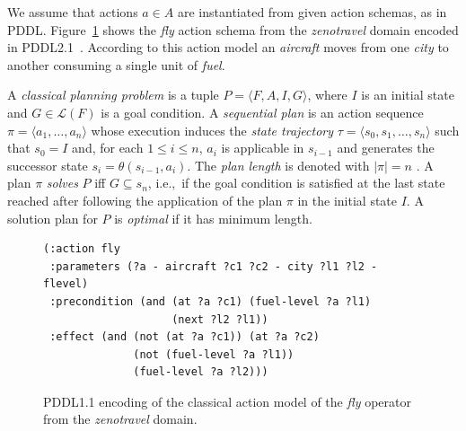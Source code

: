 \documentclass[letterpaper]{article} %
\newcommand{\tup}[1]{{\langle #1 \rangle}}
\begin{document}
We assume that actions $a\in A$ are instantiated from given action schemas, as in PDDL. Figure~\ref{fig:flyc} shows the {\em fly} action schema from the {\em zenotravel} domain encoded in PDDL2.1~\cite{fox2003pddl2}. According to this action model an {\em aircraft} moves from one {\em city} to another consuming a single unit of {\em fuel}.

A {\em classical planning problem} is a tuple $P=\tup{F,A,I,G}$, where $I$ is an initial state and $G\in\mathcal{L}(F)$ is a goal condition. A {\em sequential plan} is an action sequence $\pi=\tup{a_1, \ldots, a_n}$ whose execution induces the {\em state trajectory} $\tau=\tup{s_0, s_1, \ldots, s_n}$ such that $s_0=I$ and, for each {\small $1\leq i\leq n$}, $a_i$ is applicable in $s_{i-1}$ and generates the successor state $s_i=\theta(s_{i-1},a_i)$. The {\em plan length} is denoted with $|\pi|=n$ . A plan $\pi$ {\em solves} $P$ iff $G\subseteq s_n$, i.e.,~if the goal condition is satisfied at the last state reached after following the application of the plan $\pi$ in the initial state $I$. A solution plan for $P$ is {\em optimal} if it has minimum length.

\begin{figure}
	\begin{scriptsize}
		\begin{verbatim}
(:action fly
 :parameters (?a - aircraft ?c1 ?c2 - city ?l1 ?l2 - flevel)
 :precondition (and (at ?a ?c1) (fuel-level ?a ?l1)
                    (next ?l2 ?l1))
 :effect (and (not (at ?a ?c1)) (at ?a ?c2)
              (not (fuel-level ?a ?l1))
              (fuel-level ?a ?l2)))
		\end{verbatim}
	\end{scriptsize}
	\caption{PDDL1.1 encoding of the classical action model of the {\em fly} operator from the {\em zenotravel} domain.}
	\label{fig:flyc}
\end{figure}
\end{document}
